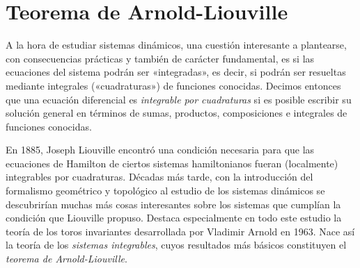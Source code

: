 \section{Teorema de Arnold-Liouville}\label{sec:arnoldliouville}
A la hora de estudiar sistemas dinámicos, una cuestión interesante a plantearse, con consecuencias prácticas y también de carácter fundamental, es si las ecuaciones del sistema podrán ser «integradas», es decir, si podrán ser resueltas mediante integrales («cua\-dra\-tu\-ras») de funciones conocidas. Decimos entonces que una ecuación diferencial es \emph{integrable por cuadraturas} si es posible escribir su solución general en términos de sumas, productos, composiciones e integrales de funciones conocidas. 

En 1885, Joseph Liouville encontró una condición necesaria para que las ecuaciones de Hamilton de ciertos sistemas hamiltonianos fueran (localmente) integrables por cuadraturas. Décadas más tarde, con la introducción del formalismo geométrico y topológico al estudio de los sistemas dinámicos se descubrirían muchas más cosas interesantes sobre los sistemas que cumplían la condición que Liouville propuso. Destaca especialmente en todo este estudio la teoría de los toros invariantes desarrollada por Vladimir Arnold en 1963. Nace así la teoría de los \emph{sistemas integrables}, cuyos resultados más básicos constituyen el \emph{teorema de Arnold-Liouville}.

